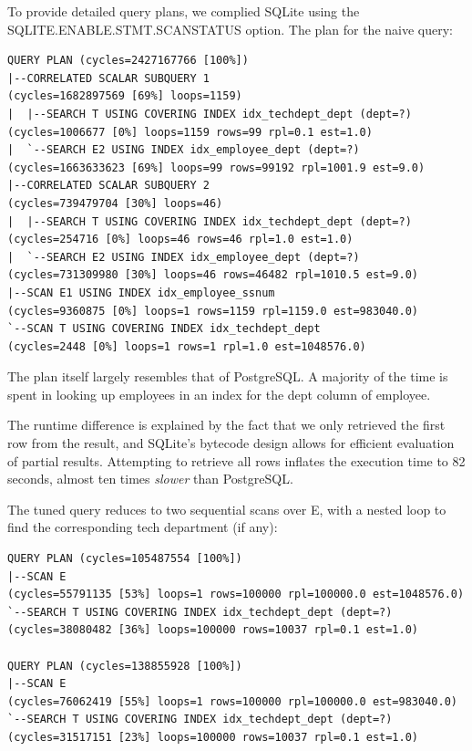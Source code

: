 \documentclass[11pt]{scrartcl}
\begin{document}
To provide detailed query plans, we complied SQLite using the SQLITE.ENABLE.STMT.SCANSTATUS option.  The plan for the naive query:

{\small
\parskip0pt\begin{verbatim}
QUERY PLAN (cycles=2427167766 [100%])
|--CORRELATED SCALAR SUBQUERY 1                                    (cycles=1682897569 [69%] loops=1159)
|  |--SEARCH T USING COVERING INDEX idx_techdept_dept (dept=?)     (cycles=1006677 [0%] loops=1159 rows=99 rpl=0.1 est=1.0)
|  `--SEARCH E2 USING INDEX idx_employee_dept (dept=?)             (cycles=1663633623 [69%] loops=99 rows=99192 rpl=1001.9 est=9.0)
|--CORRELATED SCALAR SUBQUERY 2                                    (cycles=739479704 [30%] loops=46)
|  |--SEARCH T USING COVERING INDEX idx_techdept_dept (dept=?)     (cycles=254716 [0%] loops=46 rows=46 rpl=1.0 est=1.0)
|  `--SEARCH E2 USING INDEX idx_employee_dept (dept=?)             (cycles=731309980 [30%] loops=46 rows=46482 rpl=1010.5 est=9.0)
|--SCAN E1 USING INDEX idx_employee_ssnum                          (cycles=9360875 [0%] loops=1 rows=1159 rpl=1159.0 est=983040.0)
`--SCAN T USING COVERING INDEX idx_techdept_dept                   (cycles=2448 [0%] loops=1 rows=1 rpl=1.0 est=1048576.0)
\end{verbatim}}

The plan itself largely resembles that of PostgreSQL.  A majority of the time is spent in looking up employees in an index for the dept column of employee.

The runtime difference is explained by the fact that we only retrieved the first row from the result, and SQLite's bytecode design allows for efficient evaluation of partial results.  Attempting to retrieve all rows inflates the execution time to 82 seconds, almost ten times \textit{slower} than PostgreSQL.

The tuned query reduces to two sequential scans over E, with a nested loop to find the corresponding tech department (if any):

{\small
\parskip0pt\begin{verbatim}
QUERY PLAN (cycles=105487554 [100%])
|--SCAN E                                                       (cycles=55791135 [53%] loops=1 rows=100000 rpl=100000.0 est=1048576.0)
`--SEARCH T USING COVERING INDEX idx_techdept_dept (dept=?)     (cycles=38080482 [36%] loops=100000 rows=10037 rpl=0.1 est=1.0)

QUERY PLAN (cycles=138855928 [100%])
|--SCAN E                                                       (cycles=76062419 [55%] loops=1 rows=100000 rpl=100000.0 est=983040.0)
`--SEARCH T USING COVERING INDEX idx_techdept_dept (dept=?)     (cycles=31517151 [23%] loops=100000 rows=10037 rpl=0.1 est=1.0)
\end{verbatim}}
\end{document}
